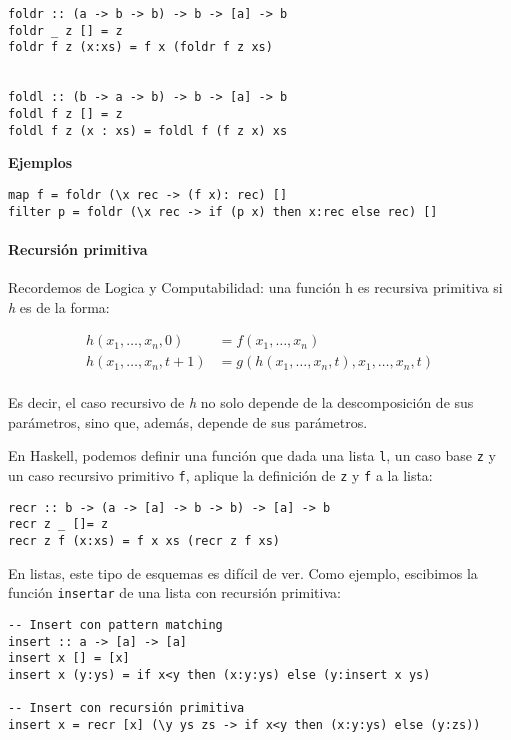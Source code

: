\begin{centrado}
	\begin{verbatim}
foldr :: (a -> b -> b) -> b -> [a] -> b
foldr _ z [] = z
foldr f z (x:xs) = f x (foldr f z xs)
		
		
foldl :: (b -> a -> b) -> b -> [a] -> b
foldl f z [] = z
foldl f z (x : xs) = foldl f (f z x) xs
\end{verbatim}
\end{centrado}

\textbf{Ejemplos}

\begin{centrado}
	\begin{verbatim}
map f = foldr (\x rec -> (f x): rec) []
filter p = foldr (\x rec -> if (p x) then x:rec else rec) []
	\end{verbatim}
\end{centrado}


\paragraph{Recursión primitiva}
Recordemos de Logica y Computabilidad: una función h es recursiva primitiva si \textit{h} es de la forma:

\begin{align*}
		h(x_1,\dots,x_n,0) &= f(x_1,\dots,x_n) \\
		h(x_1,\dots,x_n,t+1) &= g(h(x_1,\dots,x_n, t),x_1,\dots, x_n, t) \\
\end{align*}

Es decir, el caso recursivo de \textit{h} no solo depende de la descomposición de sus parámetros, sino que, además, depende de sus parámetros.

En Haskell, podemos definir una función que dada una lista \texttt{l}, un caso base \texttt{z} y un caso recursivo primitivo \texttt{f}, aplique la definición de \texttt{z} y \texttt{f} a la lista:
\begin{centrado}
	\begin{verbatim}
recr :: b -> (a -> [a] -> b -> b) -> [a] -> b
recr z _ []= z
recr z f (x:xs) = f x xs (recr z f xs)
	\end{verbatim}
\end{centrado}

En listas, este tipo de esquemas es difícil de ver. Como ejemplo, escibimos la función \texttt{insertar} de una lista con recursión primitiva:
\begin{centrado}
	\begin{verbatim}
-- Insert con pattern matching
insert :: a -> [a] -> [a]
insert x [] = [x]
insert x (y:ys) = if x<y then (x:y:ys) else (y:insert x ys)

-- Insert con recursión primitiva
insert x = recr [x] (\y ys zs -> if x<y then (x:y:ys) else (y:zs))
	\end{verbatim}
\end{centrado}

